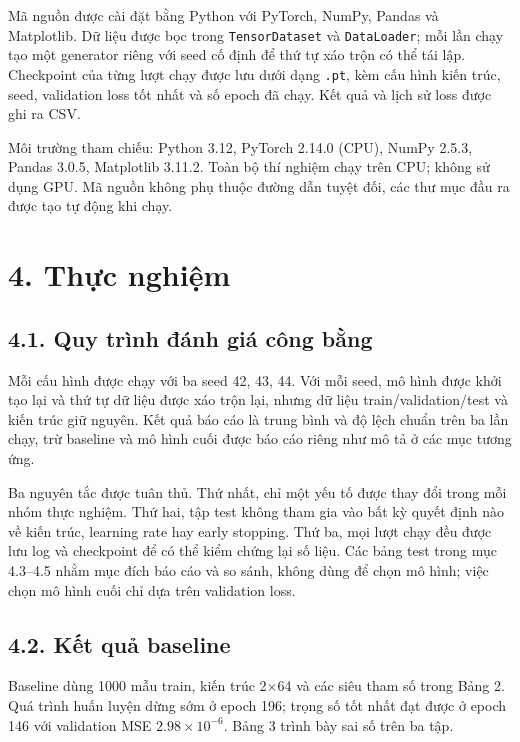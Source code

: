 \documentclass[12pt,a4paper]{article}
\begin{document}
Mã nguồn được cài đặt bằng Python với PyTorch, NumPy, Pandas và Matplotlib. Dữ liệu được bọc trong \texttt{TensorDataset} và \texttt{DataLoader}; mỗi lần chạy tạo một generator riêng với seed cố định để thứ tự xáo trộn có thể tái lập. Checkpoint của từng lượt chạy được lưu dưới dạng \texttt{.pt}, kèm cấu hình kiến trúc, seed, validation loss tốt nhất và số epoch đã chạy. Kết quả và lịch sử loss được ghi ra CSV.

Môi trường tham chiếu: Python 3.12, PyTorch 2.14.0 (CPU), NumPy 2.5.3, Pandas 3.0.5, Matplotlib 3.11.2. Toàn bộ thí nghiệm chạy trên CPU; không sử dụng GPU. Mã nguồn không phụ thuộc đường dẫn tuyệt đối, các thư mục đầu ra được tạo tự động khi chạy.

\section{4. Thực nghiệm}

\subsection{4.1. Quy trình đánh giá công bằng}

Mỗi cấu hình được chạy với ba seed 42, 43, 44. Với mỗi seed, mô hình được khởi tạo lại và thứ tự dữ liệu được xáo trộn lại, nhưng dữ liệu train/validation/test và kiến trúc giữ nguyên. Kết quả báo cáo là trung bình và độ lệch chuẩn trên ba lần chạy, trừ baseline và mô hình cuối được báo cáo riêng như mô tả ở các mục tương ứng.

Ba nguyên tắc được tuân thủ. Thứ nhất, chỉ một yếu tố được thay đổi trong mỗi nhóm thực nghiệm. Thứ hai, tập test không tham gia vào bất kỳ quyết định nào về kiến trúc, learning rate hay early stopping. Thứ ba, mọi lượt chạy đều được lưu log và checkpoint để có thể kiểm chứng lại số liệu. Các bảng test trong mục 4.3--4.5 nhằm mục đích báo cáo và so sánh, không dùng để chọn mô hình; việc chọn mô hình cuối chỉ dựa trên validation loss.

\subsection{4.2. Kết quả baseline}

Baseline dùng 1000 mẫu train, kiến trúc 2×64 và các siêu tham số trong Bảng 2. Quá trình huấn luyện dừng sớm ở epoch 196; trọng số tốt nhất đạt được ở epoch 146 với validation MSE $2.98\times10^{-6}$. Bảng 3 trình bày sai số trên ba tập.
\end{document}
